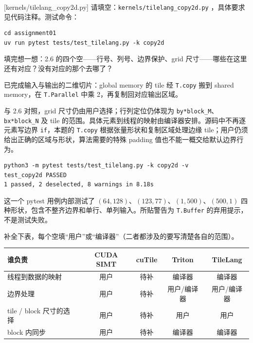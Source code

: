 \documentclass[11pt,a4paper,fontset=none]{ctexart}
\begin{document}
[kernels/tilelang\_copy2d.py]
请填空：\texttt{kernels/tilelang\_copy2d.py} ，具体要求见代码注释。测试命令：

\begin{lstlisting}
cd assignment01
uv run pytest tests/test_tilelang.py -k copy2d
\end{lstlisting}

填完想一想：2.6 的四个空——行号、列号、边界保护、grid 尺寸——哪些在这里还有对应？没有对应的那个去哪了？

\begin{tcolorbox}[title={7.4 实现、作答与实验记录},breakable]
已完成输入与输出的二维切片：global memory 的 tile 经 \texttt{T.copy} 搬到 shared memory，在 \texttt{T.Parallel} 中乘 2，再复制回对应输出区域。

与 2.6 对照，grid 尺寸仍由用户选择；行列定位仍体现为 \texttt{by*block\_M}、\texttt{bx*block\_N} 及 tile 的范围。具体元素到线程的映射由编译器安排。源码中不再逐元素写边界 \texttt{if}，本题的 \texttt{T.copy} 根据张量形状和复制区域处理边缘 tile；用户仍须给出正确的区域与形状，算法需要的特殊 padding 值也不能一概交给默认边界行为。

\begin{lstlisting}
python3 -m pytest tests/test_tilelang.py -k copy2d -v
test_copy2d PASSED
1 passed, 2 deselected, 8 warnings in 8.18s
\end{lstlisting}
这一个 pytest 用例内部测试了 $(64,128)$、$(123,77)$、$(1,500)$、$(500,1)$ 四种形状，包含不整齐边界和单行、单列输入。所贴警告为 \texttt{T.Buffer} 的弃用提示，不是测试失败。
\end{tcolorbox}

补全下表，每个空填“用户”或“编译器”（二者都涉及的要写清楚各自的范围）。

\begin{center}\small
\begin{tabular}{@{}lcccc@{}}
\toprule
谁负责 & CUDA SIMT & cuTile & Triton & TileLang \\
\midrule
线程到数据的映射 & 用户 & 待补 & 编译器 & 编译器 \\
边界处理 & 用户 & 待补 & 用户/编译器 & 用户/编译器 \\
tile / block 尺寸的选择 & 用户 & 待补 & 用户 & 用户 \\
block 内同步 & 用户 & 待补 & 编译器 & 编译器 \\
\bottomrule
\end{tabular}
\end{center}
\end{document}
